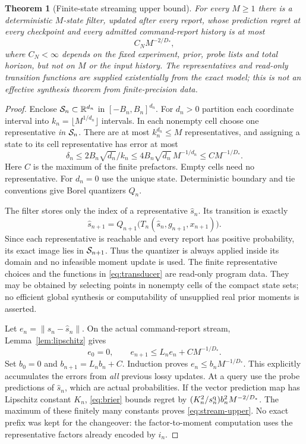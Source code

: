 \documentclass[11pt]{amsart}
\newtheorem{theorem}{Theorem}[section]
\theoremstyle{definition}\newtheorem{definition}[theorem]{Definition}
\theoremstyle{remark}\newtheorem{remark}[theorem]{Remark}
\newcommand{\R}{\mathbb R}\newcommand{\N}{\mathbb N}\newcommand{\C}{\mathbb C}
\newcommand{\norm}[1]{\left\lVert#1\right\rVert}
\begin{document}
\begin{theorem}[Finite-state streaming upper bound]\label{thm:stream-upper}
For every $M\ge1$ there is a deterministic $M$-state filter, updated after
every report, whose prediction regret at every checkpoint and every
admitted command-report history is at most
\begin{equation}\label{eq:stream-upper}
 C_N M^{-2/D_*},
\end{equation}
where $C_N<\infty$ depends on the fixed experiment, prior, probe lists
and total horizon, but not on $M$ or the input history. The representatives
and read-only transition functions are supplied existentially from the exact
model; this is not an effective synthesis theorem from finite-precision data.
\end{theorem}
\begin{proof}
Enclose $\cS_n\subset\R^{d_n}$ in $[-B_n,B_n]^{d_n}$. For $d_n>0$
partition each coordinate interval into
$k_n=\lfloor M^{1/d_n}\rfloor$ intervals. In each nonempty cell choose
one representative \emph{in} $\mathcal S_n$. There are at most $k_n^{d_n}\le M$
representatives, and assigning a state to its cell representative has
error at most
\[
 \delta_n\le 2B_n\sqrt{d_n}/k_n
 \le4B_n\sqrt{d_n}\,M^{-1/d_n}
 \le C M^{-1/D_*}.
\]
Here $C$ is the maximum of the finite prefactors. Empty cells need no
representative. For $d_n=0$ use the unique state. Deterministic boundary
and tie conventions give Borel quantizers $Q_n$.

The filter stores only the index of a representative $\widehat s_n$.
Its transition is exactly
\begin{equation}\label{eq:transducer}
 \widehat s_{n+1}
   =Q_{n+1}\bigl(T_n(\widehat s_n,g_{n+1},x_{n+1})\bigr).
\end{equation}
Since each representative is reachable and every report has positive
probability, its exact image lies in $\mathcal S_{n+1}$. Thus the quantizer is
always applied inside its domain and no infeasible moment update is used.
The finite representative choices and the functions in
\eqref{eq:transducer} are read-only program data. They may be obtained by
selecting points in nonempty cells of the compact state sets; no efficient global synthesis
or computability of unsupplied real prior moments is asserted.

Let $e_n=\norm{s_n-\widehat s_n}$. On the actual command-report stream,
Lemma~\ref{lem:lipschitz} gives
\[
 e_0=0,\qquad e_{n+1}\le L_ne_n+C M^{-1/D_*}.
\]
Set $b_0=0$ and $b_{n+1}=L_nb_n+C$. Induction proves
$e_n\le b_nM^{-1/D_*}$. This explicitly accumulates the errors from
\emph{all} previous lossy updates. At a query use the probe predictions
of $\widehat s_n$, which are actual probabilities. If the vector prediction
map has Lipschitz constant $K_n$, \eqref{eq:brier} bounds regret by
$(K_n^2/s_n^{\rm q})b_n^2 M^{-2/D_*}$. The maximum of these finitely
many constants proves \eqref{eq:stream-upper}. No exact prefix was kept
for the changeover: the factor-to-moment computation uses the representative
factors already encoded by $i_n$.
\end{proof}
\end{document}
